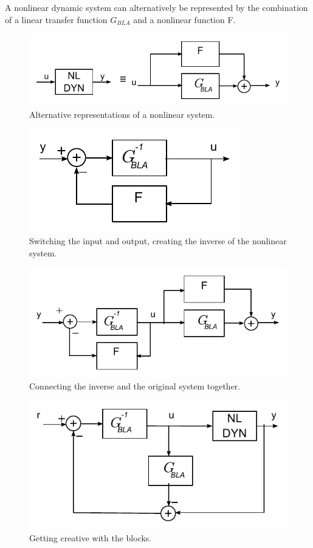 \documentclass[a4paper]{report}
\begin{document}
		A nonlinear dynamic system can alternatively be represented by the combination of a linear transfer function $G_{BLA}$ and a nonlinear function F.
		\begin{figure}[hbtp]
			\centering
			\includegraphics{images/lego1}
			\caption{Alternative representations of a nonlinear system. }
		\end{figure}
	
		\begin{figure}[hbtp]
			\centering
			\includegraphics{images/lego2}
			\caption{Switching the input and output, creating the inverse of the nonlinear system. }
		\end{figure}

		\begin{figure}[hbtp]
			\centering
			\includegraphics{images/lego3}
			\caption{Connecting the inverse and the original system together. }
		\end{figure}

		\begin{figure}[hbtp]
			\centering
			\includegraphics{images/lego4}
			\caption{Getting creative with the blocks. }
		\end{figure}
\end{document}
